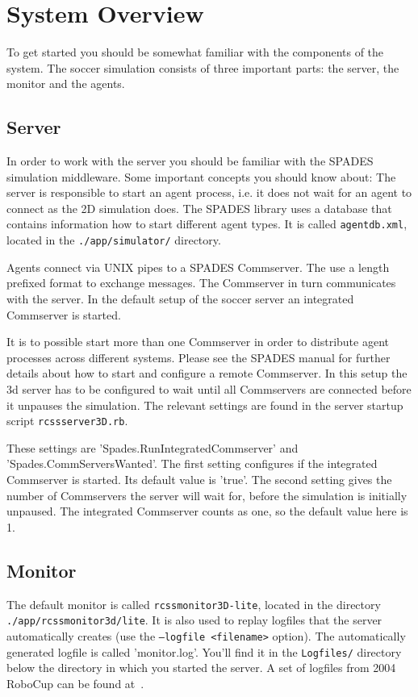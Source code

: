 \section{System Overview}

To get started you should be somewhat familiar with the components of
the system. The soccer simulation consists of three important parts:
the server, the monitor and the agents.

\subsection{Server}

In order to work with the server you should be familiar with the
SPADES~\cite{RR03}\cite{SPADES} simulation middleware. Some important
concepts you should know about: The server is responsible to start an
agent process, i.e. it does not wait for an agent to connect as the 2D
simulation does. The SPADES library uses a database that contains
information how to start different agent types. It is called
\texttt{agentdb.xml}, located in the \texttt{./app/simulator/}
directory.

Agents connect via UNIX pipes to a SPADES Commserver. The use a length
prefixed format to exchange messages. The Commserver in turn
communicates with the server. In the default setup of the soccer
server an integrated Commserver is started.

It is to possible start more than one Commserver in order to
distribute agent processes across different systems. Please see the
SPADES manual for further details about how to start and configure a
remote Commserver. In this setup the 3d server has to be configured to
wait until all Commservers are connected before it unpauses the
simulation. The relevant settings are found in the server startup
script \texttt{rcssserver3D.rb}.

These settings are 'Spades.RunIntegratedCommserver' and
'Spades.CommServersWanted'. The first setting configures if the
integrated Commserver is started. Its default value is 'true'. The
second setting gives the number of Commservers the server will wait
for, before the simulation is initially unpaused. The integrated
Commserver counts as one, so the default value here is 1.

\subsection{Monitor}

The default monitor is called \texttt{rcssmonitor3D-lite}, located in
the directory \texttt{./app/rcssmonitor3d/lite}. It is also used to
replay logfiles that the server automatically creates (use the
\texttt{--logfile <filename>} option). The automatically generated
logfile is called 'monitor.log'. You'll find it in the
\texttt{Logfiles/} directory below the directory in which you started
the server. A set of logfiles from 2004 RoboCup can be found
at~\cite{RC04LOGS}.

